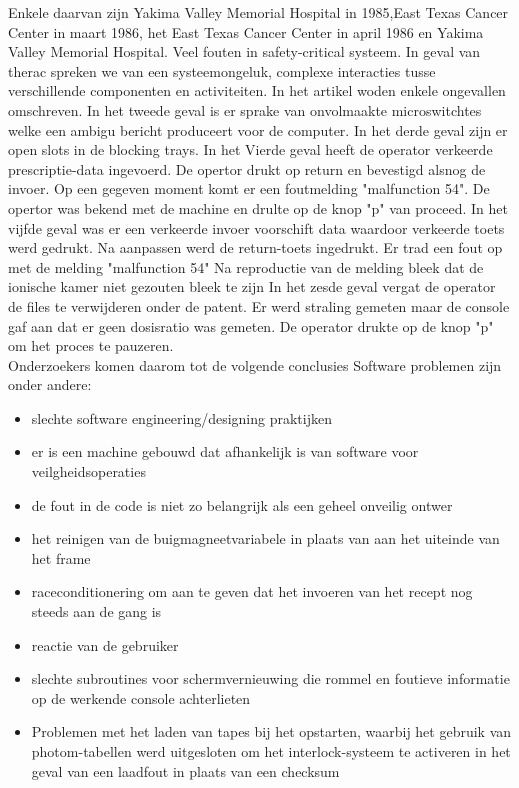 \documentclass{article}
\begin{document}
	Enkele daarvan zijn Yakima Valley Memorial Hospital in 1985,East Texas Cancer Center in maart 1986,
	het East Texas Cancer Center in april 1986 en Yakima Valley Memorial Hospital.
	Veel fouten in safety-critical systeem. In geval van therac spreken we van een systeemongeluk, complexe interacties tusse verschillende componenten  en activiteiten. In het artikel woden enkele ongevallen omschreven.
	In het tweede geval is er sprake van onvolmaakte microswitchtes welke	 een ambigu bericht produceert voor de computer.
	In het derde geval zijn er open slots in de blocking trays.
	In het Vierde geval  heeft de operator verkeerde prescriptie-data ingevoerd. De opertor drukt op return en bevestigd alsnog de invoer. Op een gegeven moment komt er een foutmelding "malfunction 54". De opertor was bekend met de machine en drulte op de knop "p" van proceed.
	In het vijfde geval was er een verkeerde invoer voorschift data waardoor verkeerde toets werd gedrukt. Na aanpassen werd de return-toets ingedrukt. Er trad een fout op met de melding "malfunction 54" Na reproductie van de melding bleek dat de ionische kamer niet gezouten bleek te zijn
	In het zesde geval vergat de operator de files te verwijderen onder de patent. Er werd straling gemeten maar de console gaf aan dat er geen dosisratio was gemeten. De operator drukte op de knop "p" om het proces te pauzeren. \\
	Onderzoekers komen daarom tot de volgende conclusies
	Software problemen zijn onder andere:
	\begin{itemize}
		\item slechte software engineering/designing praktijken
		\item er is een machine gebouwd dat afhankelijk is van software voor veilgheidsoperaties
		\item de fout in de code is niet zo belangrijk als een geheel onveilig ontwer
	\end{itemize}
	
	
	\begin{itemize}
		\item  het reinigen van de buigmagneetvariabele in plaats van aan het uiteinde van het frame
		\item  raceconditionering om aan te geven dat het invoeren van het recept nog steeds aan de gang is
		\item  reactie van de gebruiker
		\item  slechte subroutines voor schermvernieuwing die rommel en foutieve informatie op de werkende console achterlieten
		\item  Problemen met het laden van tapes bij het opstarten, waarbij het gebruik van photom-tabellen werd uitgesloten om het interlock-systeem te activeren in het geval van een laadfout in plaats van een checksum
	\end{itemize}
	
\end{document}
